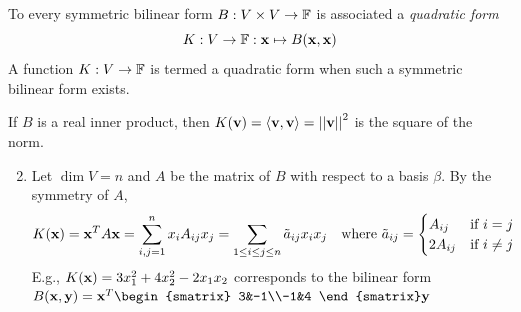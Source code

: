 \pagebreak[3]




\begin{defn}{}{}
	To every symmetric bilinear form $B:V\times V\to\mathbb{F}$ is associated a \emph{quadratic form}
	\[
		K:V\to\mathbb{F}:{\mathbf{x}}\mapsto B({\mathbf{x}},{\mathbf{x}})
	\]
	A function $K:V\to\mathbb{F}$ is termed a quadratic form when such a symmetric bilinear form exists.
\end{defn}


\begin{examples}{}{}
	\exstart If $B$ is a real inner product, then $K({\mathbf{v}})=\left\langle {\mathbf{v}},{\mathbf{v}}\right\rangle=\left| \left| {\mathbf{v}}\right|\right|^2$ is the square of the norm.
	\begin{enumerate}\setcounter{enumi}{1}  
	  \item Let $\dim V=n$ and $A$ be the matrix of $B$ with respect to a basis $\beta$. By the symmetry of $A$,
	  \[
		  K({\mathbf{x}})={\mathbf{x}}^TA{\mathbf{x}}=\sum_{i,j=1}^nx_iA_{ij}x_j 
		  =\sum_{1\le i\le j\le n}\tilde a_{ij}x_ix_j
		  \quad\text{where}\ \tilde a_{ij}=
		  \begin{cases}
			  A_{ij}&\text{if $i=j$}\\
			  2A_{ij}&\text{if }i\neq j
		  \end{cases}
	  \]
	  E.g., $K({\mathbf{x}})=3x_1^2+4x_2^2-2x_1x_2$ corresponds to the bilinear form $B(\vx,\vy)=\vx^T\begin{smatrix}
	  3&-1\\-1&4
	  \end{smatrix}\vy$
	\end{enumerate}
\end{examples}


